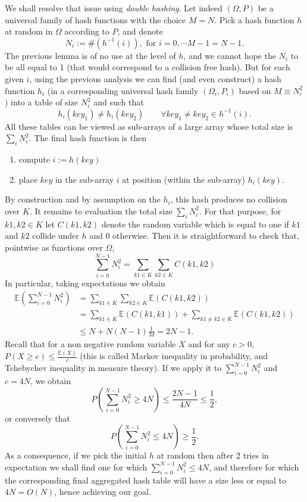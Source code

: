 \documentclass[12pt]{article}
\theoremstyle{plain}
\theoremstyle{remark}
\begin{document}
We shall resolve that issue using {\it double hashing}. Let indeed $(\Omega, P)$ be a
universal family of hash functions with the choice $M = N$. Pick a hash
function $h$ at random in $\Omega$ according to $P$, and denote  
$$N_i := \#(h^{-1}(i)), \text{ for } i = 0,\cdots M - 1 = N-1.$$
The previous lemma is of no use at the level of $h$, and we cannot hope the $N_i$ to be all
equal to 1 (that would correspond to a collision free hash). But for each given
$i$, using the previous analysis we can find (and even construct) a hash function $h_i$ (in a
corresponding universal hash family $(\Omega_i,P_i)$ based on $M \equiv N_i^2$)
into a table of size $N_i^2$ and such that 
$$
h_i(key_1) \neq h_i(key_2) \qquad \forall key_1 \neq key_2 \in h^{-1}(i).
$$
All these tables can be viewed as sub-arrays of a large array whose total size is $\sum_i N_i^2.$ The final hash
function is then
\begin{enumerate}
	\item compute $i := h(key)$
	\item place $key$ in the sub-array $i$ at position (within the
		sub-array) $h_i(key)$.
\end{enumerate}
By construction and by assumption on the $h_i$, this hash produces no collision
over $K$. It remains to evaluation the total size $\sum_i N_i^2.$
For that purpose, for $k1, k2 \in K$ let $C(k1,k2)$ denote the random variable
which is equal to one if $k1$ and $k2$ collide under $h$ and 0 otherwise. Then
it is straightforward to check that, pointwise as functions over $\Omega$, 
$$
\sum_{i=0}^{N-1} N_i^2 = \sum_{k1 \in K} \sum_{k2 \in K} C(k1,k2)
$$
In particular, taking expectations we obtain 
\begin{equation*}\begin{split}
\mathbb{E}(\sum_{i=0}^{N-1} N_i^2) &= \sum_{k1 \in K} \sum_{k2 \in K}
\mathbb{E}(C(k1,k2))\\
&= \sum_{k1 \in K}\mathbb{E}(C(k1,k1)) + \sum_{k1 \neq k2 \in
K}\mathbb{E}(C(k1,k2))\\
& \leq N + N(N-1)\frac{1}{M} = 2N - 1.
\end{split}\end{equation*}
Recall that for a non negative random variable $X$ and for any $c>0$, $P(X
\geq c) \leq \frac{\mathbb{E}(X)}{c}$ (this is called Markov inequality in
probability, and Tchebychev inequality in measure theory). If we apply it to 
$\sum_{i=0}^{N-1} N_i^2$ and $c= 4N$, we obtain
$$
P(\sum_{i=0}^{N-1} N_i^2 \geq 4N) \leq \frac{2N-1}{4N} \leq \frac12,
$$
or conversely that
$$
P(\sum_{i=0}^{N-1} N_i^2 \leq 4N) \geq \frac12. 
$$
As a consequence, if we pick the initial $h$ at random then after 2 tries in
expectation we shall find one for which $\sum_{i=0}^{N-1} N_i^2 \leq 4N$, and
therefore for which the corresponding final aggregated hash table will have a size
less or equal to $4N = O(N)$, hence achieving our goal.  
\end{document}
